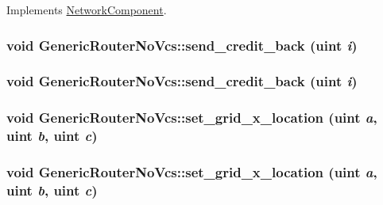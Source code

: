 Implements \hyperlink{classNetworkComponent_c93793eea1e2d424abe86e110ca8b399}{NetworkComponent}.\hypertarget{classGenericRouterNoVcs_f8bd205f15bb6ef680e1af859950f3d9}{
\subsubsection[{send\_\-credit\_\-back}]{\setlength{\rightskip}{0pt plus 5cm}void GenericRouterNoVcs::send\_\-credit\_\-back ({\bf uint} {\em i})}}
\label{classGenericRouterNoVcs_f8bd205f15bb6ef680e1af859950f3d9}


\hypertarget{classGenericRouterNoVcs_f8bd205f15bb6ef680e1af859950f3d9}{
\subsubsection[{send\_\-credit\_\-back}]{\setlength{\rightskip}{0pt plus 5cm}void GenericRouterNoVcs::send\_\-credit\_\-back ({\bf uint} {\em i})}}
\label{classGenericRouterNoVcs_f8bd205f15bb6ef680e1af859950f3d9}


\hypertarget{classGenericRouterNoVcs_9a0bc9c779518e5564bb25c0a3867434}{
\subsubsection[{set\_\-grid\_\-x\_\-location}]{\setlength{\rightskip}{0pt plus 5cm}void GenericRouterNoVcs::set\_\-grid\_\-x\_\-location ({\bf uint} {\em a}, \/  {\bf uint} {\em b}, \/  {\bf uint} {\em c})}}
\label{classGenericRouterNoVcs_9a0bc9c779518e5564bb25c0a3867434}


\hypertarget{classGenericRouterNoVcs_9a0bc9c779518e5564bb25c0a3867434}{
\subsubsection[{set\_\-grid\_\-x\_\-location}]{\setlength{\rightskip}{0pt plus 5cm}void GenericRouterNoVcs::set\_\-grid\_\-x\_\-location ({\bf uint} {\em a}, \/  {\bf uint} {\em b}, \/  {\bf uint} {\em c})}}
\label{classGenericRouterNoVcs_9a0bc9c779518e5564bb25c0a3867434}


